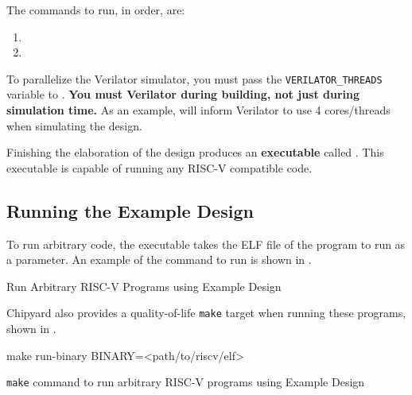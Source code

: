 The commands to run, in order, are:
\begin{enumerate}
\item {}
\item {}
\end{enumerate}

\begin{blackbox}
  To parallelize the Verilator simulator, you must pass the \texttt{VERILATOR\_THREADS} variable to .
  \textbf{You must  Verilator during building, not just during simulation time.}
  As an example,  will inform Verilator to use 4 cores/threads when simulating the design.
\end{blackbox}

Finishing the \gls{elaboration} of the design produces an \textbf{executable} called .
This executable is capable of running any RISC-V compatible code.

\subsection{Running the Example Design}\label{sec:Running_Example_Design}
To run arbitrary code, the executable takes the ELF file of the program to run as a parameter.
An example of the command to run is shown in .

\begin{listing}[h!tbp]
\caption{Run Arbitrary RISC-V Programs using Example Design}
\label{lst:Running_Example_Design}
\end{listing}

Chipyard also provides a quality-of-life \texttt{make} target when running these programs, shown in .

\begin{listing}[h!tbp]
\begin{bashsource}
make run-binary BINARY=<path/to/riscv/elf>
\end{bashsource}
\caption{\texttt{make} command to run arbitrary RISC-V programs using Example Design}
\label{lst:Running_Example_Design-Make}
\end{listing}

